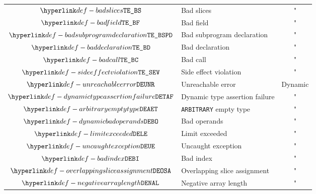 \begin{center}
\begin{tabular}{clc}
  $\BadSlices$                   & Bad slices                     & "             \\
  $\BadField$                    & Bad field                      & "             \\
  $\BadSubprogramDeclaration$    & Bad subprogram declaration     & "             \\
  $\BadDeclaration$              & Bad declaration                & "             \\
  $\BadCall$                     & Bad call                       & "             \\
  $\SideEffectViolation$         & Side effect violation          & "             \\
  \hline
  $\UnreachableError$            & Unreachable error              & Dynamic       \\
  $\DynamicTypeAssertionFailure$ & Dynamic type assertion failure & "             \\
  $\ArbitraryEmptyType$          & \texttt{ARBITRARY} empty type  & "             \\
  $\DynamicBadOperands$          & Bad operands                   & "             \\
  $\LimitExceeded$               & Limit exceeded                 & "             \\
  $\UncaughtException$           & Uncaught exception             & "             \\
  $\BadIndex$                    & Bad index                      & "             \\
  $\OverlappingSliceAssignment$  & Overlapping slice assignment   & "             \\
  $\NegativeArrayLength$         & Negative array length          & "             \\
\end{tabular}
\end{center}


